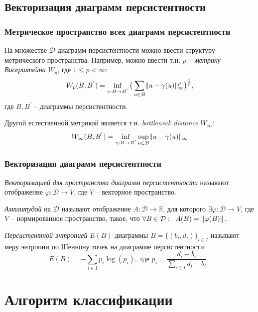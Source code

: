 \documentclass{beamer}
\DeclarePairedDelimiter\norm{\lVert}{\rVert}%
\begin{document}
		\subsection{Векторизация диаграмм персистентности}
		\begin{frame}
			\frametitle{Метрическое пространство всех диаграмм персистентности}
			На множестве $\mathcal{D}$ диаграмм персистентности можно ввести структуру метрического пространства. Например, можно ввести т.н. {\it $p-$метрику Васерштейна} $W_p$, где $1 \leq p < \infty$:
			\[
			W_p(B,B^{'}) = \inf\limits_{\gamma:B\to B^{'}} 
			\big( 
			\sum\limits_{u \in B} \norm{u - \gamma(u)}_\infty^p
			\big) ^{\frac{1}{p}},
			\]
			где $B, B^{'}$ -- диаграммы персистентности. 
			
			Другой естественной метрикой является т.н. {\it bottleneck distance} $W_\infty$:
			\[
				W_\infty(B, B^{'}) = \inf\limits_{\gamma:B\to B^{'}} \sup\limits_{u \in B}
										\norm{u - \gamma(u)}_\infty
			\]
		\end{frame}
		\begin{frame}
			\frametitle{Векторизация диаграмм персистентности}
			{\it Векторизацией для пространства диаграмм персистентности} называют отображение $ \varphi: \mathcal{D} \to V $, где $V$ -- векторное пространство. 
			
			{\it Амплитудой} на $\mathcal{D}$ называют отображение $A: \mathcal{D} \to \mathbb{R}$, для которого $\exists \varphi: \mathcal{D} \to V$, где $V$ -- нормированное пространство, такое, что $ \forall B \in \mathcal{D}: \;\; A(B) = \norm{\varphi(B)}$.
			
			{\it Персистентной энтропией} $E(B)$ диаграммы $B = \{ (b_i, d_i) \}_{i \in I}$ называют меру энтропии по Шеннону точек на диаграмме персистентности:
			\[
				E(B) = - \sum\limits_{i \in I} p_i \log(p_i), \text{ где $p_i = \dfrac{d_i - b_i}{\sum\limits_{i \in I}d_i-b_i}$. }
			\]
		\end{frame}
	
	\section{Алгоритм классификации}
\end{document}
